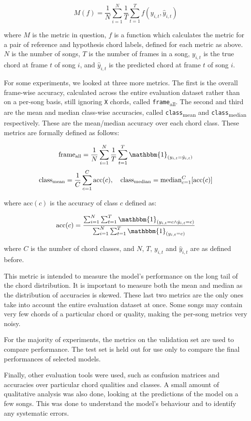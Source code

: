 \[ M(f) = \frac{1}{N} \sum_{i=1}^{N} \frac{1}{T} \sum_{t=1}^{T} f(y_{i,t}, \hat{y}_{i,t})\]

where $M$ is the metric in question, $f$ is a function which calculates the metric for a pair of reference and hypothesis chord labels, defined for each metric as above. $N$ is the number of songs, $T$ is the number of frames in a song, $y_{i,t}$ is the true chord at frame $t$ of song $i$, and $\hat{y}_{i,t}$ is the predicted chord at frame $t$ of song $i$.

For some experiments, we looked at three more metrics. The first is the overall frame-wise accuracy, calculated across the entire evaluation dataset rather than on a per-song basis, still ignoring \texttt{X} chords, called \texttt{frame}\textsubscript{all}. The second and third are the mean and median class-wise accuracies, called \texttt{class}\textsubscript{mean} and \texttt{class}\textsubscript{median} respectively. These are the mean/median accuracy over each chord class. These metrics are formally defined as follows:

\[\text{frame}\textsubscript{all} = \frac{1}{N} \sum_{i=1}^{N} \frac{1}{T} \sum_{t=1}^{T} \mathbbm{1}_{(y_{i,t} = \hat{y}_{i,t})}\]
\[
\text{class}\textsubscript{mean} = \frac{1}{C} \sum_{c=1}^{C} \text{acc}(c), \quad
\text{class}\textsubscript{median} = \text{median}_{c=1}^{C} [\text{acc}(c)]
\]

where $\text{acc}(c)$ is the accuracy of class $c$ defined as:

\[\text{acc}(c) = \frac{\sum_{i=1}^{N} \sum_{t=1}^{T} \mathbbm{1}_{(y_{i,t} = c \land \hat{y}_{i,t} = c)}}{\sum_{i=1}^{N} \sum_{t=1}^{T} \mathbbm{1}_{(y_{i,t} = c)}}\]


where $C$ is the number of chord classes, and $N$, $T$, $y_{i,t}$ and $\hat{y}_{i,t}$ are as defined before.

This metric is intended to measure the model's performance on the long tail of the chord distribution. It is important to measure both the mean and median as the distribution of accuracies is skewed. These last two metrics are the only ones take into account the entire evaluation dataset at once. Some songs may contain very few chords of a particular chord or quality, making the per-song metrics very noisy.

For the majority of experiments, the metrics on the validation set are used to compare performance. The test set is held out for use only to compare the final performances of selected models.

Finally, other evaluation tools were used, such as confusion matrices and accuracies over particular chord qualities and classes. A small amount of qualitative analysis was also done, looking at the predictions of the model on a few songs. This was done to understand the model's behaviour and to identify any systematic errors.

